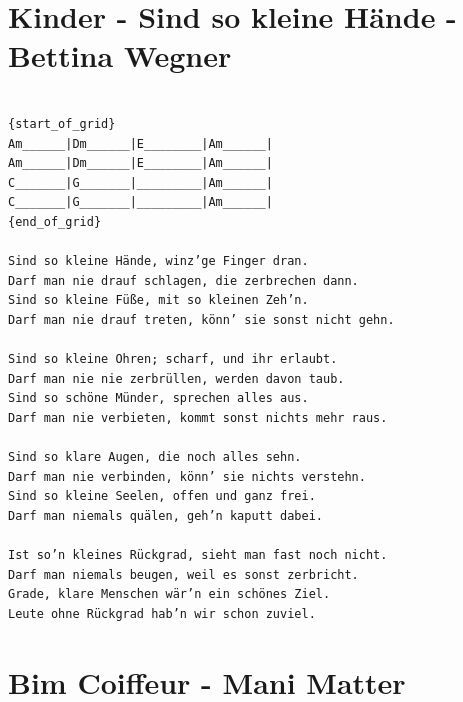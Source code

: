 \documentclass[
]{book}
\let\stdsection\section
\renewcommand\section{\clearpage\stdsection}
\begin{document}
\hypertarget{kinder---sind-so-kleine-huxe4nde---bettina-wegner}{%
\section{Kinder - Sind so kleine Hände - Bettina Wegner}\label{kinder---sind-so-kleine-huxe4nde---bettina-wegner}}

\begin{verbatim}

{start_of_grid}
Am______|Dm______|E________|Am______|
Am______|Dm______|E________|Am______|
C_______|G_______|_________|Am______|
C_______|G_______|_________|Am______|
{end_of_grid}

Sind so kleine Hände, winz’ge Finger dran.
Darf man nie drauf schlagen, die zerbrechen dann.
Sind so kleine Füße, mit so kleinen Zeh’n.
Darf man nie drauf treten, könn’ sie sonst nicht gehn.

Sind so kleine Ohren; scharf, und ihr erlaubt.
Darf man nie nie zerbrüllen, werden davon taub.
Sind so schöne Münder, sprechen alles aus.
Darf man nie verbieten, kommt sonst nichts mehr raus.

Sind so klare Augen, die noch alles sehn.
Darf man nie verbinden, könn’ sie nichts verstehn.
Sind so kleine Seelen, offen und ganz frei.
Darf man niemals quälen, geh’n kaputt dabei.

Ist so’n kleines Rückgrad, sieht man fast noch nicht.
Darf man niemals beugen, weil es sonst zerbricht.
Grade, klare Menschen wär’n ein schönes Ziel.
Leute ohne Rückgrad hab’n wir schon zuviel.
\end{verbatim}

\hypertarget{bim-coiffeur---mani-matter}{%
\section{Bim Coiffeur - Mani Matter}\label{bim-coiffeur---mani-matter}}
\end{document}
